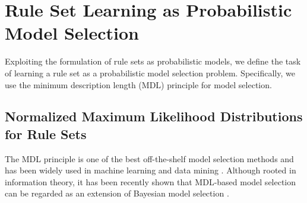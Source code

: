 \section{Rule Set Learning as Probabilistic Model Selection}
\label{sec:model_selection}

Exploiting the formulation of rule sets as probabilistic models, we define the task of learning a rule set as a probabilistic model selection problem. Specifically, we use the minimum description length (MDL) principle for model selection. 

\subsection{Normalized Maximum Likelihood Distributions for Rule Sets}

The MDL principle is one of the best off-the-shelf model selection methods and has been widely used in machine learning and data mining \citep{grunwald2019minimum, galbrun2022minimum}. 
Although rooted in information theory, it has been recently shown that MDL-based model selection can be regarded as an extension of Bayesian model selection \citep{grunwald2019minimum}. 

